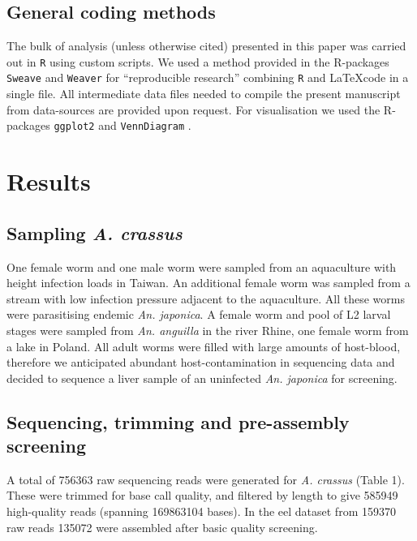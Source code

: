 \documentclass[10pt]{bmc_article}
\newenvironment{bmcformat}{\begin{raggedright}\baselineskip20pt\sloppy\setboolean{publ}{false}}{\end{raggedright}\baselineskip20pt\sloppy}
\begin{document}
\begin{bmcformat}
\subsection*{General coding methods}

The bulk of analysis (unless otherwise cited) presented in this paper
was carried out in \texttt{R} \cite{R_project} using custom
scripts. We used a method provided in the R-packages \texttt{Sweave}
\cite{lmucs-papers:Leisch:2002} and \texttt{Weaver} \cite{weaver} for
``reproducible research'' combining \texttt{R} and \LaTeX code in a
single file. All intermediate data files needed to compile the present
manuscript from data-sources are provided upon request. For
visualisation we used the R-packages \texttt{ggplot2}
\cite{ggplot-book} and \texttt{VennDiagram} \cite{pmid21269502}.


\section*{Results}


\subsection*{Sampling \textit{A. crassus}}

One female worm and one male worm were sampled from an aquaculture
with height infection loads in Taiwan. An additional female worm was
sampled from a stream with low infection pressure adjacent to the
aquaculture. All these worms were parasitising endemic
\textit{An. japonica}. A female worm and pool of L2 larval stages were
sampled from \textit{An. anguilla} in the river Rhine, one female worm
from a lake in Poland. All adult worms were filled with large amounts
of host-blood, therefore we anticipated abundant host-contamination in
sequencing data and decided to sequence a liver sample of an uninfected
\textit{An. japonica} for screening.

 \subsection*{Sequencing, trimming and pre-assembly screening}






A total of 756363 raw sequencing reads were
generated for \textit{A. crassus} (Table 1). These were trimmed for
base call quality, and filtered by length to give
585949 high-quality reads (spanning
169863104 bases). In the eel dataset from
159370 raw reads 135072 were
assembled after basic quality screening.


\end{bmcformat}
\end{document}
